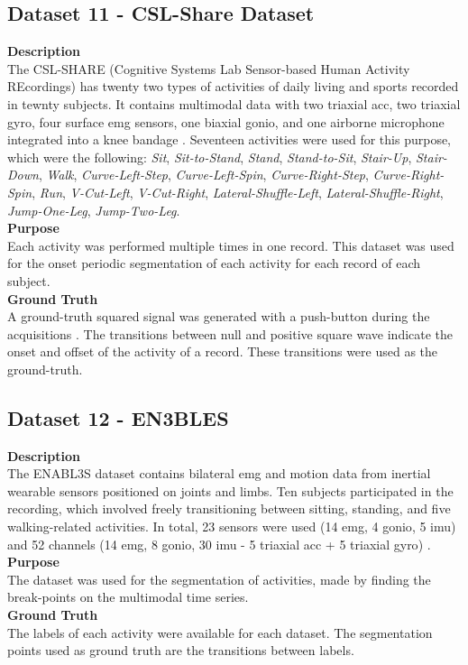 \subsection{Dataset 11 - CSL-Share Dataset}
\label{dat:dataset12}
\textbf{Description} \hfill \\
The CSL-SHARE (Cognitive Systems Lab Sensor-based Human Activity REcordings) has twenty two types of activities of daily living and sports recorded in tewnty subjects. It contains multimodal data with two triaxial \gls{acc}, two triaxial \gls{gyro}, four surface \gls{emg} sensors, one biaxial \gls{gonio}, and one airborne microphone integrated into a knee bandage \cite{dataset_hui}. Seventeen activities were used for this purpose, which were the following: \textit{Sit}, \textit{Sit-to-Stand}, \textit{Stand}, \textit{Stand-to-Sit}, \textit{Stair-Up}, \textit{Stair-Down}, \textit{Walk}, \textit{Curve-Left-Step}, \textit{Curve-Left-Spin}, \textit{Curve-Right-Step}, \textit{Curve-Right-Spin}, \textit{Run}, \textit{V-Cut-Left}, \textit{V-Cut-Right}, \textit{Lateral-Shuffle-Left}, \textit{Lateral-Shuffle-Right}, \textit{Jump-One-Leg}, \textit{Jump-Two-Leg}.\\
\textbf{Purpose}\\
Each activity was performed multiple times in one record. This dataset was used for the onset periodic segmentation of each activity for each record of each subject.\\
\textbf{Ground Truth}\\
A ground-truth squared signal was generated with a push-button during the acquisitions \cite{dataset_hui}. The transitions between null and positive square wave indicate the onset and offset of the activity of a record. These transitions were used as the ground-truth.

\subsection{Dataset 12 - EN3BLES}
\label{dat:dataset13}
\textbf{Description}\\
The ENABL3S dataset contains bilateral \gls{emg} and motion data from inertial wearable sensors positioned on joints and limbs. Ten subjects participated in the recording, which involved freely transitioning between sitting, standing, and five walking-related activities. In total, 23 sensors were used (14 \gls{emg}, 4 \gls{gonio}, 5 \gls{imu}) and 52 channels (14 \gls{emg}, 8 \gls{gonio}, 30 \gls{imu} - 5 triaxial \gls{acc} + 5 triaxial \gls{gyro}) \cite{enables}.\\
\textbf{Purpose}\\
The dataset was used for the segmentation of activities, made by finding the break-points on the multimodal time series.\\
\textbf{Ground Truth}\\
The labels of each activity were available for each dataset. The segmentation points used as ground truth are the transitions between labels.

